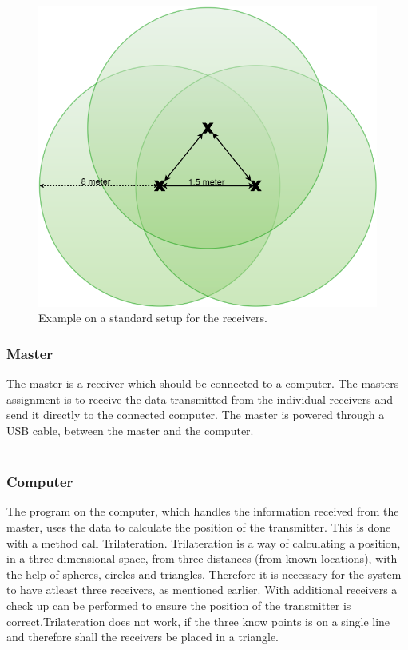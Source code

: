 \begin{figure}[H]
	\centering
	\includegraphics[scale=0.9]{figures/receiverSetup}
	\caption{Example on a standard setup for the receivers. }
	\label{fig:receiverSetup}
	\flushleft
\end{figure}

\subsubsection{Master}
The master is a receiver which should be connected to a computer. The masters assignment is to receive the data transmitted from the individual receivers and send it directly to the connected computer. The master is powered through a USB cable, between the master and the computer.\\\\

\subsubsection{Computer}
The program on the computer, which handles the information received from the master, uses the data to calculate the position of the transmitter. This is done with a method call Trilateration. Trilateration is a way of calculating a position, in a three-dimensional space, from three distances (from known locations), with the help of spheres, circles and triangles. Therefore it is necessary for the system to have atleast three receivers, as mentioned earlier.  With additional receivers a check up can be performed to ensure the position of the transmitter is correct.Trilateration does not work, if the three know points is on a single line and therefore shall the receivers be placed in a triangle.\\\\

